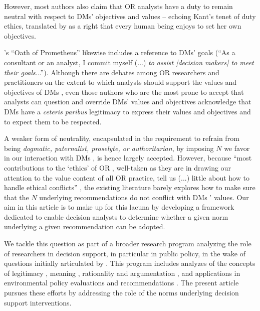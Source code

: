 \documentclass[preprint, french, english, 11pt, authoryear]{elsarticle}%
\newcommand{\possessivecite}[1]{\citeauthor{#1}’s \citeyearpar{#1}}
\begin{document}
However, most authors also claim that \ac{OR} 
analysts have a duty to remain neutral with respect to \acp{DM}' objectives and values
-- echoing Kant’s tenet of duty ethics, translated by \citet{reisach_creation_2016} as a right that every human being enjoys to set her own objectives.
\begin{changebar}\possessivecite{brans_or_2002} ``Oath of Prometheus'' likewise includes a reference to \acp{DM}' goals 
(``As a consultant or an analyst, I commit myself (...) \emph{to assist [decision makers] to meet their goals}...'').
Although there are debates among \ac{OR} researchers and practitioners on the extent to which analysts should support the values and objectives of \acp{DM} \citep{brans_ethics_2007}, even those authors who are the most prone to accept that analysts can question and override \acp{DM}' values and objectives acknowledge that \acp{DM} have a \emph{ceteris paribus} legitimacy to express their values and objectives and to expect them to be respected.
\end{changebar}A weaker form of neutrality, encapsulated in the requirement to refrain from being \emph{dogmatic, paternalist, proselyte, or authoritarian}, by imposing $N$ we favor in our interaction with \acp{DM}
, is hence largely accepted. However, because ``most contributions to the ‘ethics’ of \ac{OR}
, well-taken as they are in drawing our attention to the value content of all \ac{OR}
 practice, tell us (...) little about how to handle ethical conflicts'' \citep{ormerod_operational_2013},
the existing literature barely explores how to make sure that the $N$ underlying recommendations do not conflict with \acp{DM}
' values. Our aim in this article is to make up for this lacuna by developing a framework dedicated to enable decision analysts to determine whether a given norm underlying a given recommendation can be adopted.

We tackle this question as part of a broader research program analyzing the role of researchers in decision support, in particular in public policy, in the wake of questions initially articulated by \citet{tsoukias_policy_2013}.
This program includes analyzes of the concepts of legitimacy \citep{meinard_what_2017}, meaning \citep{meinard_utility_2018}, rationality \citep{meinard_rationality_2019} and argumentation \citep{cailloux_formal_2018}, 
and applications in environmental policy evaluations \citep{jeanmougin_mismatch_2017} and recommendations \citep{choulak_meta-decision-analysis_2019}.
The present article pursues these efforts by addressing the role of the norms underlying decision support interventions.
\end{document}
